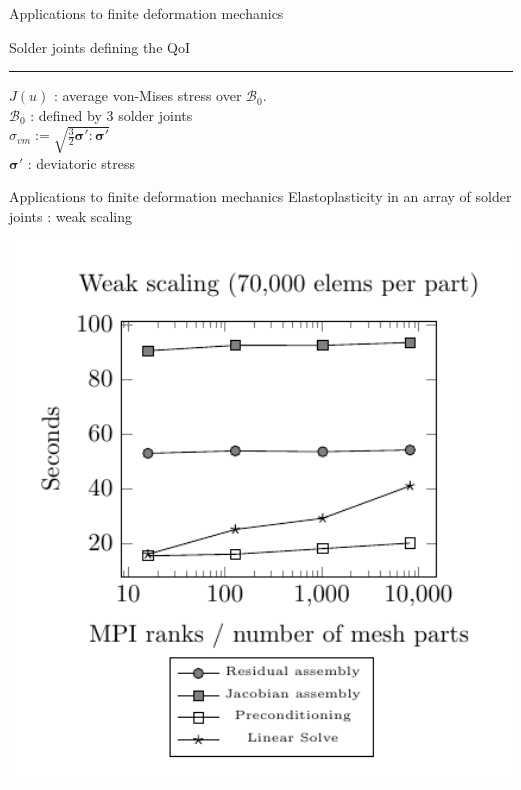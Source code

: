 \documentclass[fleqn]{beamer}
\newcommand{\bs}[1]{\boldsymbol{#1}}
\begin{document}
\begin{frame}{Applications to finite deformation mechanics}
\begin{minipage}{0.5\textwidth}
\begin{figure}
\end{figure}
Solder joints defining the QoI \\ 
\hrule
\vspace{1em}
$J(u)$ : average von-Mises stress over $\mathcal{B}_0$. \\
$\mathcal{B}_0$ : defined by 3 solder joints \\
$\sigma_{vm} := \sqrt{\frac32 \bs{\sigma}' : \bs{\sigma}'}$ \\
$\bs{\sigma}'$ : deviatoric stress
\end{minipage}
\end{frame}


\begin{frame}{Applications to finite deformation mechanics}
{Elastoplasticity in an array of solder joints : weak scaling}
\begin{minipage}{0.6\textwidth}
\centering
\hspace*{-3.2em}
\includegraphics[width=1.15\textwidth]{../img/aut_weak_scaling}
\end{minipage}%
\begin{minipage}{0.4\textwidth}

\end{minipage}
\end{frame}
\end{document}
